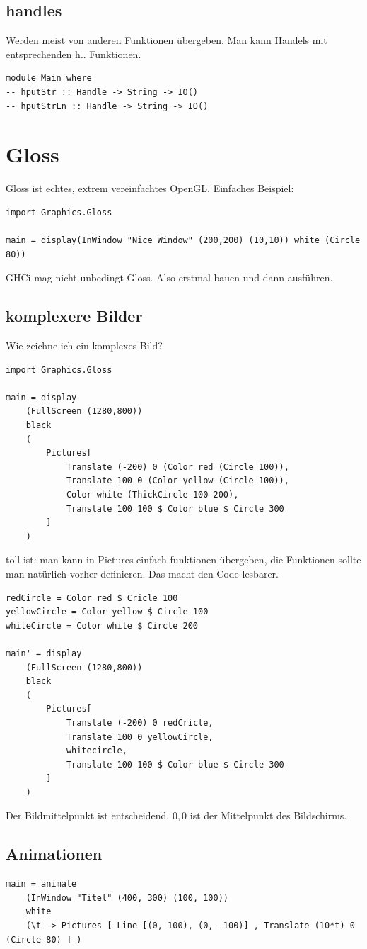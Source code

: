 \documentclass[ngerman,a4paper]{report}
\begin{document}
\subsection{handles}
Werden meist von anderen Funktionen übergeben. Man kann Handels mit entsprechenden h.. Funktionen.
\begin{lstlisting}
module Main where
-- hputStr :: Handle -> String -> IO()
-- hputStrLn :: Handle -> String -> IO()
\end{lstlisting}

\section{Gloss}
Gloss ist echtes, extrem vereinfachtes OpenGL. Einfaches Beispiel: 
\begin{lstlisting}
import Graphics.Gloss

main = display(InWindow "Nice Window" (200,200) (10,10)) white (Circle 80))
\end{lstlisting}
GHCi mag nicht unbedingt Gloss. Also erstmal bauen und dann ausführen.\\

\subsection{komplexere Bilder}
Wie zeichne ich ein komplexes Bild?\\
\begin{lstlisting}
import Graphics.Gloss

main = display
	(FullScreen (1280,800)) 
	black
	(
		Pictures[
			Translate (-200) 0 (Color red (Circle 100)),
			Translate 100 0 (Color yellow (Circle 100)),
			Color white (ThickCircle 100 200),
			Translate 100 100 $ Color blue $ Circle 300
		]		
	) 
\end{lstlisting}
toll ist: man kann in Pictures einfach funktionen übergeben, die Funktionen sollte man natürlich vorher definieren. Das macht den Code lesbarer.
\begin{lstlisting}
redCircle = Color red $ Cricle 100
yellowCircle = Color yellow $ Circle 100
whiteCircle = Color white $ Circle 200

main' = display
	(FullScreen (1280,800)) 
	black
	(
		Pictures[
			Translate (-200) 0 redCricle,
			Translate 100 0 yellowCircle,
			whitecircle,
			Translate 100 100 $ Color blue $ Circle 300
		]		
	)
\end{lstlisting}

Der Bildmittelpunkt ist entscheidend. $0,0$ ist der Mittelpunkt des Bildschirms.

\subsection{Animationen}
\begin{lstlisting}
main = animate
	(InWindow "Titel" (400, 300) (100, 100))
	white
	(\t -> Pictures [ Line [(0, 100), (0, -100)] , Translate (10*t) 0 (Circle 80) ] )
\end{lstlisting}
\end{document}
